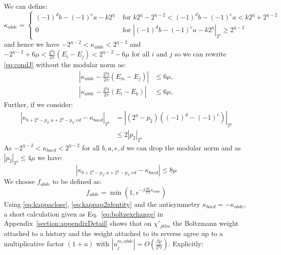 \documentclass[aps,floatfix,10pt,amssymb,amsfont,amsmath,superscriptaddress,float,nofootinbib,longbibliography,nobalancelastpage,twocolumn]{revtex4-2}
\begin{document}
\begin{widetext}
We can define:
\begin{equation}
    \kappa_{abde} = \begin{cases}(-1)^db-(-1)^ea-k2^{\eta}& \text{ for } k2^{\eta} - 2^{\eta-2}< (-1)^db-(-1)^ea < k2^{\eta} + 2^{\eta-2}\\
    0 & \text{ for } |(-1)^db-(-1)^ea - k2^{\eta}|_{2^{\eta}} \geq 2^{\eta-2}
    \end{cases}
    \label{eq:kappadef}
\end{equation}
and hence we have $-2^{\eta-2}<\kappa_{abde} < 2^{\eta-2}$ and $-2^{\eta-2}+6\mu < \frac{2^{\eta}t}{2\pi}(E_i -E_j) < 2^{\eta-2}-6\mu$ for all $i$ and $j$ so we can rewrite \eqref{eq:condJ} without the modular norm as:
\begin{equation}
    \begin{aligned}
    \left|\kappa_{abde}-\frac{2^{\eta}t}{2\pi}(E_m-E_j)\right|&\leq 6\mu,\\
    \left|\kappa_{abde}-\frac{2^{\eta}t}{2\pi}(E_l-E_k)\right|&\leq 6\mu,
\end{aligned}
\label{eq:kappaclose}
\end{equation}
Further, if we consider:
\begin{align}
    \left|\kappa_{b+2^{\eta}-p_2,a+2^{\eta}-p_2,ed} - \kappa_{baed}\right|_{2^{\eta}} &= |(2^{\eta}-p_2)((-1)^d-(-1)^e)|_{2^{\eta}}\\
    &\leq 2|p_2|_{2^\eta}
\end{align}
As $-2^{\eta-2}<\kappa_{baed} < 2^{\eta-2}$ for all $b,a,e,d$ we can drop the modular norm and as $|p_2|_{2^\eta} \leq 4\mu$ we have:
\begin{equation}
    \left|\kappa_{b+2^{\eta}-p_2,a+2^{\eta}-p_2,ed} - \kappa_{baed}\right| \leq 8\mu
    \label{eq:kappap2identity}
\end{equation}
We choose $f_{abde}$ to be defined as:
\begin{equation}
    f_{abde} = \min(1,e^{-\beta\frac{2\pi}{2^{\eta}t}\kappa_{abde}})
\end{equation}
Using \eqref{eq:kappaclose}, \eqref{eq:kappap2identity} and the antisymmetry $\kappa_{baed}=-\kappa_{abde}$, a short calculation given as Eq.~\eqref{eq:boltzexchange} in Appendix~\ref{section:appendixDetail} shows that on $\chi'_{jklm}$ the Boltzmann weight attached to a history and the weight attached to its reverse agree up to a multiplicative factor $(1+u)$ with $|u^{m,abde}_j| = O(\frac{\beta\mu}{2^{\eta}t})$. Explicitly:
\begin{equation}
\begin{aligned}

\end{aligned}
\end{equation}
\end{widetext}
\end{document}
